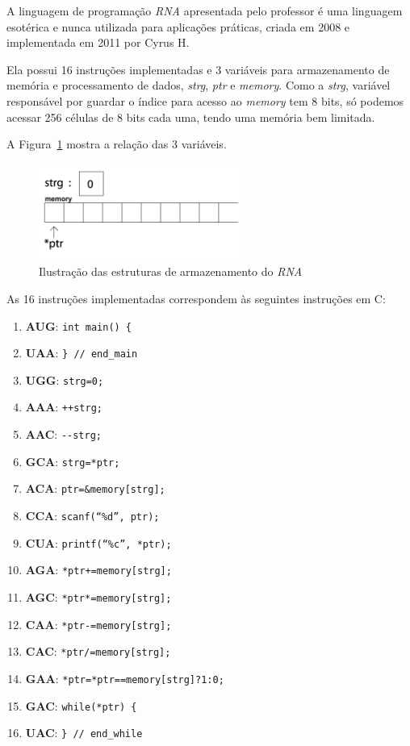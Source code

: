 
A linguagem de programação \emph{RNA} apresentada pelo professor é uma linguagem esotérica e nunca utilizada para aplicações práticas, criada em 2008 e implementada em 2011 por Cyrus H.  

Ela possui 16 instruções implementadas e 3 variáveis para armazenamento de memória e processamento de dados, \emph{strg}, \emph{ptr} e \emph{memory}. Como a \emph{strg}, variável responsável por guardar o índice para acesso ao \emph{memory} tem 8 bits, só podemos acessar 256 células de 8 bits cada uma, tendo uma memória bem limitada.

A Figura~\ref{fig:expl-rna} mostra a relação das 3 variáveis.

\begin{figure}[htbp]
    \centering
    \includegraphics[width=0.6\textwidth]{./images/expl-rna.png}
    \caption{Ilustração das estruturas de armazenamento do \emph{RNA}}
    \label{fig:expl-rna}
\end{figure}

As 16 instruções implementadas correspondem às seguintes instruções em C:

\begin{enumerate}
	\item \textbf{AUG}: \verb$int main() {$
	\item \textbf{UAA}: \verb$} // end_main$
	\item \textbf{UGG}: \verb$strg=0;$
	\item \textbf{AAA}: \verb$++strg;$
	\item \textbf{AAC}: \verb$--strg;$
	\item \textbf{GCA}: \verb$strg=*ptr;$
	\item \textbf{ACA}: \verb$ptr=&memory[strg];$
	\item \textbf{CCA}: \verb$scanf(“%d”, ptr);$
	\item \textbf{CUA}: \verb$printf(“%c”, *ptr);$
	\item \textbf{AGA}: \verb$*ptr+=memory[strg];$
	\item \textbf{AGC}: \verb$*ptr*=memory[strg];$
	\item \textbf{CAA}: \verb$*ptr-=memory[strg];$
	\item \textbf{CAC}: \verb$*ptr/=memory[strg];$
	\item \textbf{GAA}: \verb$*ptr=*ptr==memory[strg]?1:0;$
	\item \textbf{GAC}: \verb$while(*ptr) {$
	\item \textbf{UAC}: \verb$} // end_while$
\end{enumerate}


